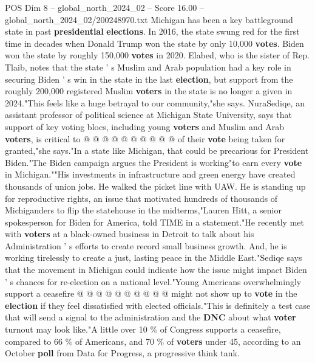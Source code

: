 \begin{textsample}{POS Dim 8 – global\_north\_2024\_02 – Score 16.00 – global\_north\_2024\_02/200248970.txt}
Michigan has been a key battleground state in past \textbf{presidential} \textbf{elections}.
In 2016, the state swung red for the first time in decades when Donald Trump won the state by only 10,000 \textbf{votes}.
Biden won the state by roughly 150,000 \textbf{votes} in 2020.
Elabed, who is the sister of Rep.
Tlaib, notes that the state ' s Muslim and Arab population had a key role in securing Biden ' s win in the state in the last \textbf{election}, but support from the roughly 200,000 registered Muslim \textbf{voters} in the state is no longer a given in 2024."This feels like a huge betrayal to our community,"she says.
NuraSediqe, an assistant professor of political science at Michigan State University, says that support of key voting blocs, including young \textbf{voters} and Muslim and Arab \textbf{voters}, is critical to @ @ @ @ @ @ @ @ @ @ of their \textbf{vote} being taken for granted,"she says."In a state like Michigan, that could be precarious for President Biden."The Biden campaign argues the President is working"to earn every \textbf{vote} in Michigan.""His investments in infrastructure and green energy have created thousands of union jobs.
He walked the picket line with UAW.
He is standing up for reproductive rights, an issue that motivated hundreds of thousands of Michiganders to flip the statehouse in the midterms,"Lauren Hitt, a senior spokesperson for Biden for America, told TIME in a statement."He recently met with \textbf{voters} at a black-owned business in Detroit to talk about his Administration ' s efforts to create record small business growth.
And, he is working tirelessly to create a just, lasting peace in the Middle East."Sediqe says that the movement in Michigan could indicate how the issue might impact Biden ' s chances for re-election on a national level."Young Americans overwhelmingly support a ceasefire @ @ @ @ @ @ @ @ @ @ might not show up to \textbf{vote} in the \textbf{election} if they feel dissatisfied with elected officials."This is definitely a test case that will send a signal to the administration and the \textbf{DNC} about what \textbf{voter} turnout may look like."A little over 10 \% of Congress supports a ceasefire, compared to 66 \% of Americans, and 70 \% of \textbf{voters} under 45, according to an October \textbf{poll} from Data for Progress, a progressive think tank.

\end{textsample}
